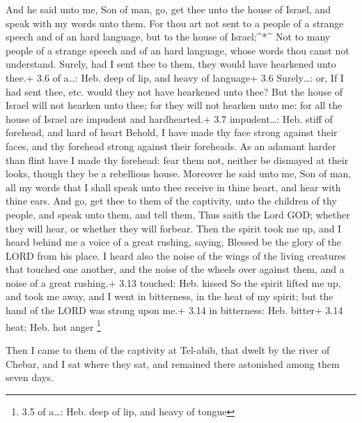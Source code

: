  And he said unto me, Son of man, go, get thee unto the
house of Israel, and speak with my words unto them.  For
thou art not sent to a people of a strange speech and of an hard
language, but to the house of Israel;\^{}*\^{}  Not to many
people of a strange speech and of an hard language, whose words thou
canst not understand. Surely, had I sent thee to them, they would have
hearkened unto thee.+ 3.6 of a\ldots: Heb. deep of lip, and heavy of
language+ 3.6 Surely\ldots: or, If I had sent thee, etc. would they not
have hearkened unto thee?  But the house of Israel will not
hearken unto thee; for they will not hearken unto me: for all the house
of Israel are impudent and hardhearted.+ 3.7 impudent\ldots: Heb. stiff
of forehead, and hard of heart  Behold, I have made thy face
strong against their faces, and thy forehead strong against their
foreheads.  As an adamant harder than flint have I made thy
forehead: fear them not, neither be dismayed at their looks, though they
be a rebellious house.  Moreover he said unto me, Son of
man, all my words that I shall speak unto thee receive in thine heart,
and hear with thine ears.  And go, get thee to them of the
captivity, unto the children of thy people, and speak unto them, and
tell them, Thus saith the Lord GOD; whether they will hear, or whether
they will forbear.  Then the spirit took me up, and I heard
behind me a voice of a great rushing, saying, Blessed be the glory of
the LORD from his place.  I heard also the noise of the
wings of the living creatures that touched one another, and the noise of
the wheels over against them, and a noise of a great rushing.+ 3.13
touched: Heb. kissed  So the spirit lifted me up, and took
me away, and I went in bitterness, in the heat of my spirit; but the
hand of the LORD was strong upon me.+ 3.14 in bitterness: Heb. bitter+
3.14 heat: Heb. hot anger \footnote{3.5 of a\ldots: Heb. deep of lip,
  and heavy of tongue}

 Then I came to them of the captivity at Tel-abib, that
dwelt by the river of Chebar, and I sat where they sat, and remained
there astonished among them seven days.

